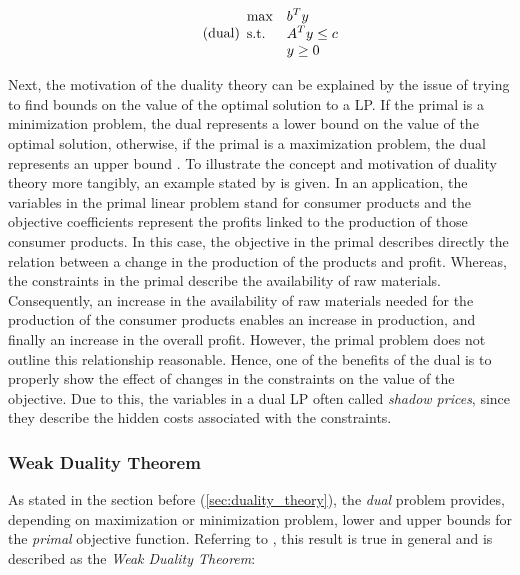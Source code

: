 \begin{equation}
    \tag{dual}
    \begin{array}{ll@{}ll}
        \text{max}  & \displaystyle b^{T}y &\\
        \text{s.t.}& \displaystyle A^{T}y \leq c &\\
                    &                        y \geq 0
    \end{array}
\end{equation}


Next, the motivation of the duality theory can be explained by the issue of trying to find 
bounds on the value of the optimal solution to a LP. 
If the primal is a minimization problem, the dual represents a lower bound
on the value of the optimal solution, otherwise, if the primal is a maximization problem,
the dual represents an upper bound .
To illustrate the concept and motivation of duality theory more tangibly, an example stated by 
 is given. 
In an application, the variables in the primal linear problem stand for consumer products and
the objective coefficients represent the profits linked to the production of those consumer products. 
In this case, the objective in the primal describes directly the relation between a change
in the production of the products and profit. Whereas, the constraints in the primal 
describe the availability of raw materials. Consequently, an increase in the availability of 
raw materials needed for the production of the consumer products enables an increase in production,
and finally an increase in the overall profit. 
However, the primal problem does not outline this relationship reasonable. Hence, one of 
the benefits of the dual is to properly show the effect of changes in the constraints on the
value of the objective. Due to this, the variables in a dual LP often called 
\textit{shadow prices}, since they describe the hidden costs associated with the constraints. 

\subsubsection{Weak Duality Theorem}
As stated in the section before (\ref{sec:duality_theory}), the \textit{dual} problem 
provides, depending on maximization or minimization problem, lower and upper bounds for 
the \textit{primal} objective function. Referring to ,
this result is true in general and is described as the \textit{Weak Duality Theorem}:

